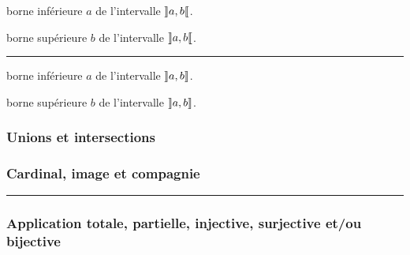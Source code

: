 \documentclass[12pt,a4paper]{article}
\theoremstyle{definition}
\newcommand\separation{
	\medskip
	\hfill\rule{0.5\textwidth}{0.75pt}\hfill
	\medskip
}
\begin{document}


 borne inférieure $a$ de l'intervalle $\ZintervalO{a}{b}$.

 borne supérieure $b$ de l'intervalle $\ZintervalO{a}{b}$.


\separation




 borne inférieure $a$ de l'intervalle $\ZintervalOC{a}{b}$.

 borne supérieure $b$ de l'intervalle $\ZintervalOC{a}{b}$.

\subsubsection{Unions et intersections}



\subsubsection{Cardinal, image et compagnie}




\separation





\subsubsection{Application totale, partielle, injective, surjective et/ou bijective}

\vspace{-.75em}
\begin{multicols}{2}
    
    
    
    
    
    
    
\end{multicols}
\end{document}
